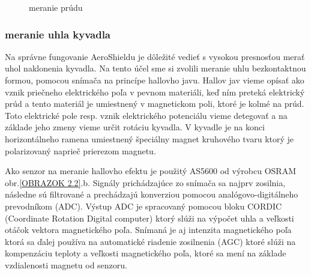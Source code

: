 \begin{figure}[!tbh]
\hfill
{}
\hfill
{}
\hfill
\caption{meranie prúdu}\label{OBRAZOK 2.3}
\end{figure}


\label{Hall}
\pagebreak

\subsubsection{meranie uhla kyvadla}
\label{meruhl}

Na správne fungovanie AeroShieldu je dôležité vedieť s vysokou presnosťou merať uhol naklonenia kyvadla. Na tento účel sme si zvolili meranie uhlu bezkontaktnou formou, pomocou snímača na princípe hallovho javu. Hallov jav vieme opísať ako vznik priečneho elektrického poľa v pevnom materiáli, keď ním preteká elektrický prúd a tento materiál je umiestnený v magnetickom poli, ktoré je kolmé na prúd\cite{Hall}. Toto elektrické pole resp. vznik elektrického potenciálu vieme detegovať a na základe jeho zmeny vieme určit rotáciu kyvadla. V kyvadle je na konci horizontálneho ramena umiestnený špeciálny magnet kruhového tvaru ktorý je polarizovaný naprieč prierezom magnetu.

Ako senzor na meranie hallovho efektu je použitý AS5600 od výrobcu OSRAM obr.\ref{OBRAZOK 2.2}.b. Signály prichádzajúce zo snímača sa najprv zosilnia, následne sú filtrované a prechádzajú konverziou pomocou analógovo-digitálneho prevodníkom (ADC). Výstup ADC je spracovaný pomocou bloku CORDIC (Coordinate Rotation Digital computer) ktorý slúži na výpočet uhla a veľkosti otáčok vektora magnetického poľa. Snímaná je aj intenzita magnetického poľa ktorá sa ďalej používa na
automatické riadenie zosilnenia (AGC) ktoré slúži na kompenzáciu teploty a veľkosti magnetického poľa, ktoré sa mení na základe vzdialenosti magnetu od senzoru.

